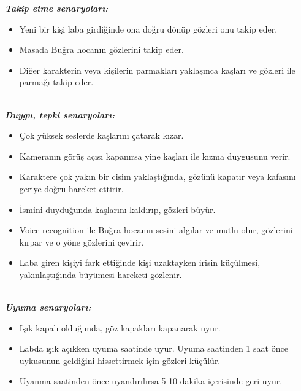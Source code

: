 \documentclass[11pt]{article}
\begin{document}
\textbf{\textit{Takip etme senaryoları:}}\\
\begin{itemize}
\item Yeni bir kişi laba girdiğinde ona doğru dönüp gözleri onu takip eder.\\
\item Masada Buğra hocanın gözlerini takip eder.\\
\item Diğer karakterin veya kişilerin parmakları yaklaşınca kaşları ve gözleri ile parmağı takip eder.\\\\
\end{itemize}
\textbf{\textit{Duygu, tepki senaryoları:}}\\
\begin{itemize}
\item \c{C}ok yüksek seslerde kaşlarını çatarak kızar.\\
\item Kameranın görüş açısı kapanırsa yine kaşları ile kızma duygusunu verir.\\
\item Karaktere çok yakın bir cisim yaklaştığında, gözünü kapatır veya kafasını geriye doğru hareket ettirir.
\item İsmini duyduğunda kaşlarını kaldırıp, gözleri büyür.\\
\item Voice recognition ile Buğra hocanın sesini algılar ve mutlu olur, gözlerini kırpar ve o yöne gözlerini çevirir.\\
\item Laba giren kişiyi fark ettiğinde kişi uzaktayken irisin küçülmesi, yakınlaştığında büyümesi hareketi gözlenir.\\\\
\end{itemize}
\textbf{\textit{Uyuma senaryoları:}}\\
\begin{itemize}
\item Işık kapalı olduğunda, göz kapakları kapanarak uyur.\\
\item Labda ışık açıkken uyuma saatinde uyur. Uyuma saatinden 1 saat önce uykusunun geldiğini hissettirmek için gözleri küçülür.\\
\item Uyanma saatinden önce uyandırılırsa 5-10 dakika içerisinde geri uyur.\\\\\\
\end{itemize}
\end{document}
